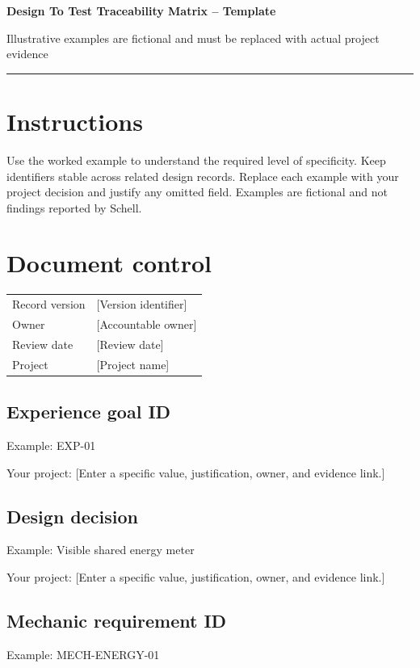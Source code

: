 \documentclass[11pt]{article}
\begin{document}
{\huge\bfseries\color{suiteblue} Design To Test Traceability Matrix -- Template}\par
\vspace{0.15in}
{\normalsize\color{suitegray} Illustrative examples are fictional and must be replaced with actual project evidence}\par
\vspace{0.15in}\hrule\vspace{0.15in}

\section{Instructions}
Use the worked example to understand the required level of specificity. Keep identifiers stable across related design records. Replace each example with your project decision and justify any omitted field. Examples are fictional and not findings reported by Schell.


\section{Document control}
\begin{tabularx}{\linewidth}{@{}lX@{}}\toprule Record version & [Version identifier]\\ Owner & [Accountable owner]\\ Review date & [Review date]\\ Project & [Project name]\\\bottomrule\end{tabularx}

\subsection{Experience goal ID}
Example: EXP-01

Your project: [Enter a specific value, justification, owner, and evidence link.]


\subsection{Design decision}
Example: Visible shared energy meter

Your project: [Enter a specific value, justification, owner, and evidence link.]


\subsection{Mechanic requirement ID}
Example: MECH-ENERGY-01
\end{document}
